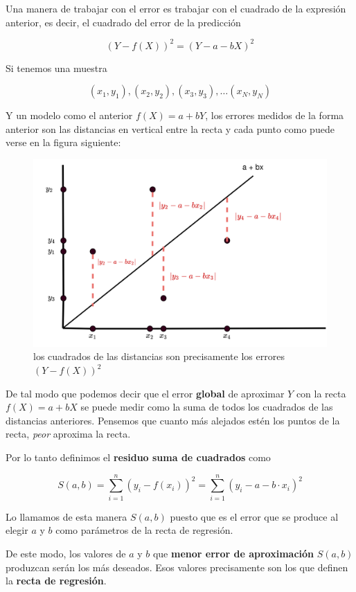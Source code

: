 \documentclass[
]{article}
\begin{document}
Una manera de trabajar con el error es trabajar con el cuadrado de la
expresión anterior, es decir, el cuadrado del error de la predicción

\[(Y- f(X))^2 = (Y- a - bX)^2\]

Si tenemos una muestra

\[(x_1, y_1), (x_2, y_2), (x_3,y_3), \ldots (x_N,y_N)\]

Y un modelo como el anterior \(f(X) = a + bY\), los errores medidos de
la forma anterior son las distancias en vertical entre la recta y cada
punto como puede verse en la figura siguiente:

\begin{figure}
\centering
\includegraphics[width=4.6875in,height=\textheight]{least_squares.png}
\caption{los cuadrados de las distancias son precisamente los errores
\((Y- f(X))^2\)}
\end{figure}

De tal modo que podemos decir que el error \textbf{global} de aproximar
\(Y\) con la recta \(f(X)= a+bX\) se puede medir como la suma de todos
los cuadrados de las distancias anteriores. Pensemos que cuanto más
alejados estén los puntos de la recta, \emph{peor} aproxima la recta.

Por lo tanto definimos el \textbf{residuo suma de cuadrados} como

\[S(a,b) =  \sum^n_{i=1} (y_i - f(x_i))^2 =  \sum^n_{i=1} (y_i - a -b\cdot x_i)^2\]

Lo llamamos de esta manera \(S(a,b)\) puesto que es el error que se
produce al elegir \(a\) y \(b\) como parámetros de la recta de
regresión.

De este modo, los valores de \(a\) y \(b\) que \textbf{menor error de
aproximación} \(S(a,b)\) produzcan serán los más deseados. Esos valores
precisamente son los que definen la \textbf{recta de regresión}.
\end{document}
